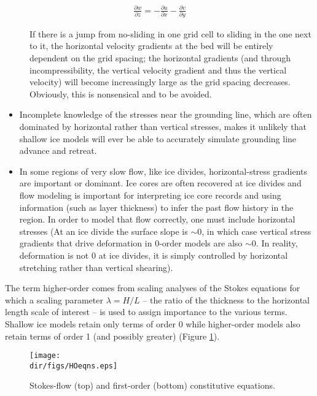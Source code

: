 \begin{align*}
\frac{\partial w}{\partial z} = -\frac{\partial u}{\partial x}-\frac{\partial v}{\partial y}
\end{align*}

\begin{description}
\item[]	If there is a jump from no-sliding in one grid cell to sliding in the one next to it, the horizontal velocity gradients at the bed will be entirely dependent on the grid spacing; the horizontal gradients (and through incompressibility, the vertical velocity gradient and thus the vertical velocity) will become increasingly large as the grid spacing decreases. Obviously, this is nonsensical and to be avoided.

\end{description}
\begin{itemize}
\item Incomplete knowledge of the stresses near the grounding line, which are often dominated by horizontal rather than vertical stresses, makes it unlikely that shallow ice models will ever be able to accurately simulate grounding line advance and retreat.

\item In some regions of very slow flow, like ice divides, horizontal-stress gradients are important or dominant. Ice cores are often recovered at ice divides and flow modeling is important for interpreting ice core records and using information (such as layer thickness) to infer the past flow history in the region. In order to model that flow correctly, one must include horizontal stresses (At an ice divide the surface slope is \(\sim\)0, in which case vertical stress gradients that drive deformation in 0-order models are also \(\sim\)0. In reality, deformation is not 0 at ice divides, it is simply controlled by horizontal stretching rather than vertical shearing).
\end{itemize}

The term higher-order comes from scaling analyses of the Stokes equations for which a scaling parameter $\lambda=H/L$ -- the ratio of the thickness to the horizontal length scale of interest -- is used to assign importance to the various terms. Shallow ice models retain only terms of order 0 while higher-order models also retain terms of order 1 (and possibly greater) (Figure \ref{fig:hoeqns}). 

\begin{figure}
  \begin{center}
    \texttt{[image: \\dir/figs/HOeqns.eps]}
   \end{center}
  \caption{Stokes-flow (top) and first-order (bottom) constitutive equations.}
  \label{fig:hoeqns}
\end{figure} 

